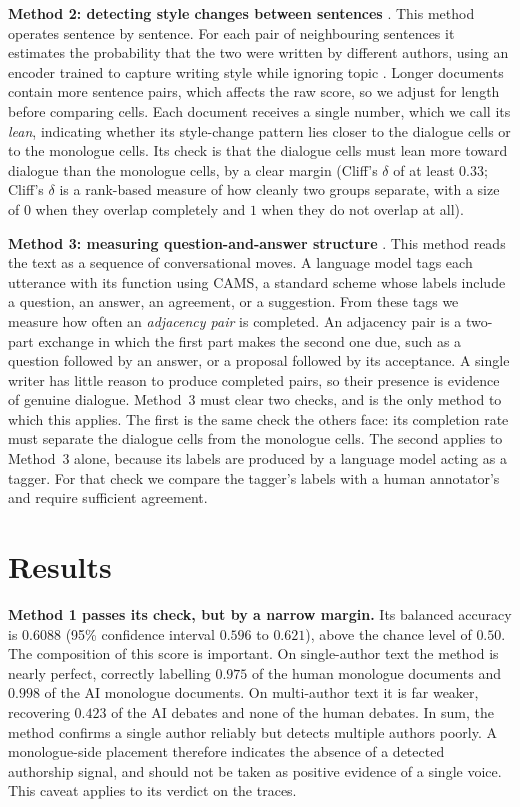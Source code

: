 \documentclass[10pt,twocolumn]{article}
\begin{document}
\textbf{Method 2: detecting style changes between sentences} \cite{schmidt2025}. This method operates
sentence by sentence. For each pair of neighbouring sentences it estimates the probability that the
two were written by different authors, using an encoder trained to capture writing style while
ignoring topic \cite{patel2025}. Longer documents contain more sentence pairs, which affects the raw
score, so we adjust for length before comparing cells. Each document receives a single number, which
we call its \emph{lean}, indicating whether its style-change pattern lies closer to the dialogue cells
or to the monologue cells. Its check is that the dialogue cells must lean more toward dialogue than
the monologue cells, by a clear margin (Cliff's $\delta$ of at least $0.33$; Cliff's $\delta$ is a
rank-based measure of how cleanly two groups separate, with a size of $0$ when they overlap completely
and $1$ when they do not overlap at all).

\textbf{Method 3: measuring question-and-answer structure} \cite{duran2022,schegloff1973}. This
method reads the text as a sequence of conversational moves. A language model tags each utterance with
its function using CAMS, a standard scheme whose labels include a question, an answer, an agreement,
or a suggestion. From these tags we measure how often an \emph{adjacency pair} is completed. An
adjacency pair is a two-part exchange in which the first part makes the second one due, such as a
question followed by an answer, or a proposal followed by its acceptance. A single writer has little
reason to produce completed pairs, so their presence is evidence of genuine dialogue. Method~3 must
clear two checks, and is the only method to which this applies. The first is the same check the others
face: its completion rate must separate the dialogue cells from the monologue cells. The second
applies to Method~3 alone, because its labels are produced by a language model acting as a tagger. For
that check we compare the tagger's labels with a human annotator's and require sufficient agreement.

\section{Results}
\textbf{Method 1 passes its check, but by a narrow margin.} Its balanced accuracy is $0.6088$ (95\%
confidence interval $0.596$ to $0.621$), above the chance level of $0.50$. The composition of this
score is important. On single-author text the method is nearly perfect, correctly labelling $0.975$
of the human monologue documents and $0.998$ of the AI monologue documents. On multi-author text it
is far weaker, recovering $0.423$ of the AI debates and none of the human debates. In sum, the method
confirms a single author reliably but detects multiple authors poorly. A monologue-side placement
therefore indicates the absence of a detected authorship signal, and should not be taken as positive
evidence of a single voice. This caveat applies to its verdict on the traces.
\end{document}
